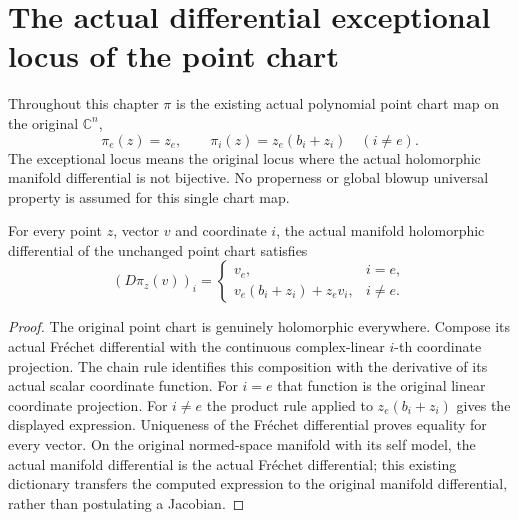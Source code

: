 \section{The actual differential exceptional locus of the point chart}

Throughout this chapter $\pi$ is the existing actual polynomial point
chart map on the original $\mathbb C^n$,
\[
 \pi_e(z)=z_e,\qquad \pi_i(z)=z_e(b_i+z_i)\quad(i\ne e).
\]
The exceptional locus means the original locus where the actual
holomorphic manifold differential is not bijective. No properness or
global blowup universal property is assumed for this single chart map.

\begin{theorem}
\label{hir:actual-point-blowup-differential-coordinates}
\leanok
For every point $z$, vector $v$ and coordinate $i$, the actual manifold
holomorphic differential of the unchanged point chart satisfies
\[
 (D\pi_z(v))_i=
 \begin{cases}
 v_e,&i=e,\\
 v_e(b_i+z_i)+z_e v_i,&i\ne e.
 \end{cases}
\]
\end{theorem}
\begin{proof}
The original point chart is genuinely holomorphic everywhere. Compose
its actual Fr\'echet differential with the continuous complex-linear
$i$-th coordinate projection. The chain rule identifies this composition
with the derivative of its actual scalar coordinate function. For
$i=e$ that function is the original linear coordinate projection. For
$i\ne e$ the product rule applied to $z_e(b_i+z_i)$ gives the displayed
expression. Uniqueness of the Fr\'echet differential proves equality for
every vector. On the original normed-space manifold with its self model,
the actual manifold differential is the actual Fr\'echet differential;
this existing dictionary transfers the computed expression to the
original manifold differential, rather than postulating a Jacobian.
\end{proof}

